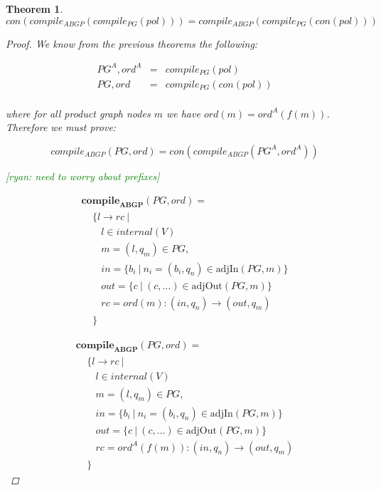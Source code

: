 \documentclass[twocolumn]{sig-alternate-10pt}
\newcommand{\ryan}[1]{\textcolor{green}{[ryan: #1]}}
\newtheorem{thm}{Theorem}[section]
\begin{document}
\begin{thm}
  $con(compile_{ABGP}(compile_{PG}(pol))) = compile_{ABGP}(compile_{PG}(con(pol)))$

  \begin{proof}

    We know from the previous theorems the following:

    \[ \begin{array}{lll}
       PG^A, ord^A      &=& compile_{PG}(pol) \\
       PG, ord          &=& compile_{PG}(con(pol)) \\
    \end{array} \]%

    where for all product graph nodes $m$ we have $ord(m) = ord^A(f(m))$. Therefore we must prove:

    $$compile_{ABGP}(PG,ord) = con(compile_{ABGP}(PG^A,ord^A))$$

    \ryan{need to worry about prefixes}

    \[ \begin{array}{l}
       \textbf{compile}_\textbf{ABGP}(PG,ord) = \\
       ~~~~~ \{ l \rightarrow rc ~\vert \\
       ~~~~~~~~~ l \in internal(V) \\
       ~~~~~~~~~ m = (l,q_m) \in PG, \\
       ~~~~~~~~~ in = \{ b_i ~\vert~ n_i = (b_i,q_n) \in \text{adjIn}(PG,m) \} \\
       ~~~~~~~~~ out = \{ c ~\vert~ (c,\dots) \in \text{adjOut}(PG,m) \} \\
       ~~~~~~~~~ rc = ord(m) : (in,q_n) \rightarrow (out,q_m) \\
       ~~~~~ \}
    \end{array} \]%

    \[ \begin{array}{l}
       \textbf{compile}_\textbf{ABGP}(PG,ord) = \\
       ~~~~~ \{ l \rightarrow rc ~\vert \\
       ~~~~~~~~~ l \in internal(V) \\
       ~~~~~~~~~ m = (l,q_m) \in PG, \\
       ~~~~~~~~~ in = \{ b_i ~\vert~ n_i = (b_i,q_n) \in \text{adjIn}(PG,m) \} \\
       ~~~~~~~~~ out = \{ c ~\vert~ (c,\dots) \in \text{adjOut}(PG,m) \} \\
       ~~~~~~~~~ rc = ord^A(f(m)) : (in,q_n) \rightarrow (out,q_m) \\
       ~~~~~ \}
    \end{array} \]%


\end{proof}
\end{thm}
\end{document}
